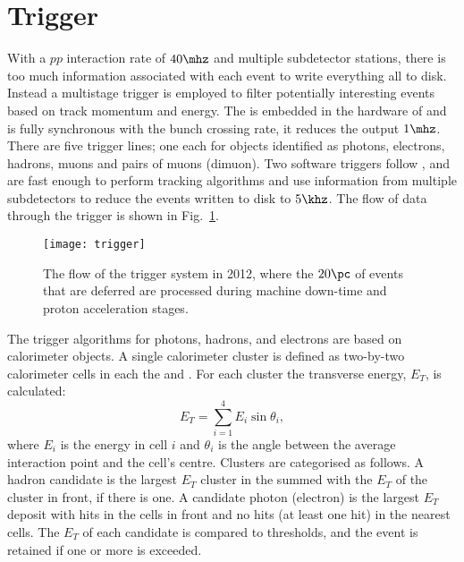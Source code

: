 \section{Trigger}
\label{sec:lhcb:trig}

With a $pp$ interaction rate of $40\mhz$ and multiple subdetector stations, there is too much
information associated with each event to write everything all to disk.
Instead a multistage trigger is employed to filter potentially interesting events based on track
momentum and energy.
The \lone is embedded in the hardware of \lhcb and is fully synchronous with
the bunch crossing rate, it reduces the output $1\mhz$.
There are five \lone trigger lines; one each for objects identified as
photons, electrons, hadrons, muons and pairs of muons (dimuon).
Two software triggers follow \lone, and are fast enough to perform tracking algorithms and use
information from
multiple subdetectors to reduce the events written to disk to $5\khz$.
The flow of data through the trigger is shown in Fig.~\ref{fig:lhcb:trigger}.

\begin{figure}
  \begin{center}
    \texttt{[image: trigger]}
  \end{center}
  \caption[LHCb trigger sequence in 2012]
  {
    The flow of the \lhcb trigger system in 2012,
    where the $20\pc$ of events that are deferred are
    processed during machine down-time and proton acceleration stages.
  }
  \label{fig:lhcb:trigger}
\end{figure}

The \lone trigger algorithms for photons, hadrons, and electrons are based on calorimeter objects.
A single calorimeter cluster is defined as two-by-two calorimeter cells in each the \ecal and
\hcal.
For each cluster the transverse energy, $E_T$, is calculated:
\begin{equation}
  E_T = \sum_{i=1}^4E_i\sin\theta_i,
\end{equation}
where $E_i$ is the energy in cell $i$ and $\theta_i$ is the angle between the average
interaction point and the cell's centre.
Clusters are categorised as follows.
A hadron candidate is the largest $E_T$ cluster in the \hcal summed with the $E_T$ of the \ecal
cluster in front, if there is one.
A candidate photon (electron) is the largest $E_T$ deposit with hits in the \presh cells in front and
no hits (at least one hit) in the nearest \spd cells.
The $E_T$ of each candidate is compared to thresholds, and the event is retained if one or more is
exceeded.

